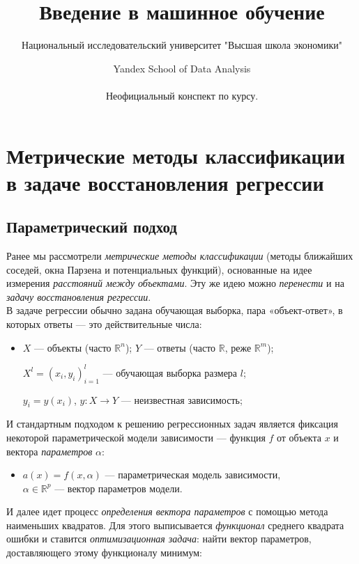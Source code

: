\documentclass{article}
\title{Введение в машинное обучение}
\author{Национальный исследовательский университет "Высшая школа экономики" \and Yandex School of Data Analysis\\\\
Неофициальный конспект по курсу.}
\begin{document}
\maketitle
\tableofcontents
\newpage

\section{Метрические методы классификации в задаче восстановления регрессии}
\subsection{Параметрический подход}

Ранее мы рассмотрели \textit{метрические методы классификации} (методы ближайших соседей, окна Парзена и потенциальных функций), основанные на идее измерения \textit{расстояний между объектами}. Эту же идею можно \textit{перенести} и на \textit{задачу восстановления регрессии}.
\\

В задаче регрессии обычно задана обучающая выборка, пара «объект-ответ», в которых ответы --- это действительные числа:

\begin{itemize}
\item $X$ --- объекты (часто $\mathbb{R}^n$);
$Y$ --- ответы (часто $\mathbb{R}$, реже $\mathbb{R}^m$);

$X^l = (x_i, y_i)_{i = 1}^l$ --- обучающая выборка размера $l$;

$y_i = y(x_i)$, $y: X \rightarrow Y$ --- неизвестная зависимость;
\end{itemize}

 И стандартным подходом к решению регрессионных задач является фиксация некоторой параметрической модели зависимости --- функция $f$ от объекта $x$ и вектора \textit{параметров } $\alpha$:

\begin{itemize}
\item $a(x) = f(x, \alpha)$ --- параметрическая модель зависимости,\\
$\alpha \in \mathbb{R}^p$ --- вектор параметров модели.

\end{itemize} 
 И далее идет процесс \textit{определения вектора параметров} с помощью метода наименьших квадратов. Для этого выписывается \textit{функционал} среднего квадрата ошибки и ставится \textit{оптимизационная задача}: найти вектор параметров, доставляющего этому функционалу минимум:
 
\end{document}
